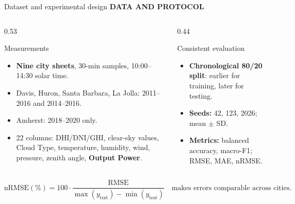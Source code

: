\documentclass[aspectratio=169,11pt]{beamer}
\newcommand{\sectiontag}[1]{{\footnotesize\usebeamercolor[fg]{structure}\textbf{#1}}\par\vspace{0.10cm}}
\begin{document}
\begin{frame}{Dataset and experimental design}
\sectiontag{DATA AND PROTOCOL}
\begin{columns}[T,totalwidth=\textwidth]
\begin{column}{0.53\textwidth}
\begin{block}{Measurements}
\small
\begin{itemize}
\setlength\itemsep{0.15em}
\item \textbf{Nine city sheets}, 30-min samples, 10:00--14:30 solar time.
\item Davis, Huron, Santa Barbara, La Jolla: 2011--2016 and 2014--2016.
\item Amherst: 2018--2020 only.
\item 22 columns: DHI/DNI/GHI, clear-sky values, Cloud Type, temperature, humidity, wind, pressure, zenith angle, \textbf{Output Power}.
\end{itemize}
\end{block}
\end{column}
\begin{column}{0.44\textwidth}
\begin{block}{Consistent evaluation}
\small
\begin{itemize}
\setlength\itemsep{0.25em}
\item \textbf{Chronological 80/20 split}: earlier for training, later for testing.
\item \textbf{Seeds:} 42, 123, 2026; mean $\pm$ SD.
\item \textbf{Metrics:} balanced accuracy, macro-F1; RMSE, MAE, nRMSE.
\end{itemize}
\end{block}
\end{column}
\end{columns}
\vspace{-0.15cm}
\[
\mathrm{nRMSE}(\%) = 100\cdot\frac{\mathrm{RMSE}}{\max(y_{\mathrm{test}})-\min(y_{\mathrm{test}})}
\quad\text{makes errors comparable across cities.}
\]
\end{frame}
\end{document}
